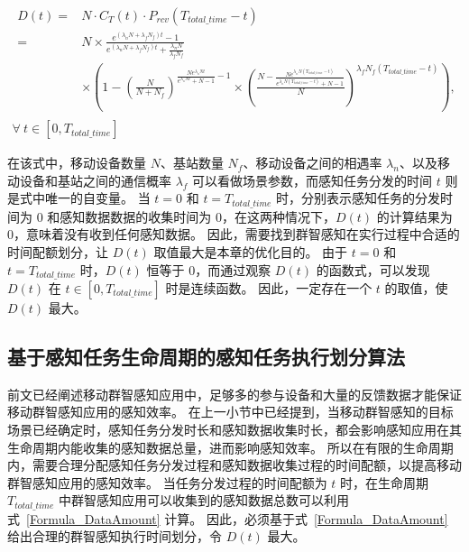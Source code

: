 \vspace{-2.5em}
\begin{equation}
  \label{Formula_DataAmount}
  \begin{gathered}
    \begin{aligned}
      D(t) = &N \cdot C_T(t) \cdot P_{rcv}(T_{total\_time}-t)\\
      = &N \times \frac{e^{(\lambda_n N + \lambda_f N_f) t} - 1}{e^{(\lambda_n N + \lambda_f N_f) t} + \frac{\lambda_n N}{\lambda_f N_f}} \\
      &\times (1 -  (\frac{N}{N + N_f})^{\frac{N e^{\lambda_n N t}}{e^{\lambda_n N t} + N -1} - 1} \times (\frac{N-\frac{N e^{\lambda_n N (T_{total\_time} - t)}}{e^{\lambda_n N (T_{total\_time} - t)} + N -1}}{N})^{\lambda_f N_f (T_{total\_time} - t)}),
    \end{aligned}\\
    \forall \ t \in [0, T_{total\_time}]
  \end{gathered}
\end{equation}

在该式中，移动设备数量 $N$、基站数量 $N_f$、移动设备之间的相遇率 $\lambda_n$、以及移动设备和基站之间的通信概率 $\lambda_f$ 可以看做场景参数，而感知任务分发的时间 $t$ 则是式中唯一的自变量。
当 $t = 0$ 和 $t = T_{total\_time}$ 时，分别表示感知任务的分发时间为 0 和感知数据数据的收集时间为 0，在这两种情况下，$D(t)$ 的计算结果为0，意味着没有收到任何感知数据。
因此，需要找到群智感知在实行过程中合适的时间配额划分，让 $D(t)$ 取值最大是本章的优化目的。
由于 $t = 0$ 和 $t = T_{total\_time}$ 时，$D(t)$ 恒等于 $0$，而通过观察 $D(t)$ 的函数式，可以发现 $D(t)$ 在 $ t \in [0, T_{total\_time}] $ 时是连续函数。
因此，一定存在一个 $t$ 的取值，使 $D(t)$ 最大。

\subsection{基于感知任务生命周期的感知任务执行划分算法}
\label{UIC:algo}


前文已经阐述移动群智感知应用中，足够多的参与设备和大量的反馈数据才能保证移动群智感知应用的感知效率。
在上一小节中已经提到，当移动群智感知的目标场景已经确定时，感知任务分发时长和感知数据收集时长，都会影响感知应用在其生命周期内能收集的感知数据总量，进而影响感知效率。
所以在有限的生命周期内，需要合理分配感知任务分发过程和感知数据收集过程的时间配额，以提高移动群智感知应用的感知效率。
当任务分发过程的时间配额为 $t$ 时，在生命周期 $T_{total\_time}$ 中群智感知应用可以收集到的感知数据总数可以利用式~\eqref{Formula_DataAmount} 计算。
因此，必须基于式~\eqref{Formula_DataAmount} 给出合理的群智感知执行时间划分，令 $D(t)$ 最大。


